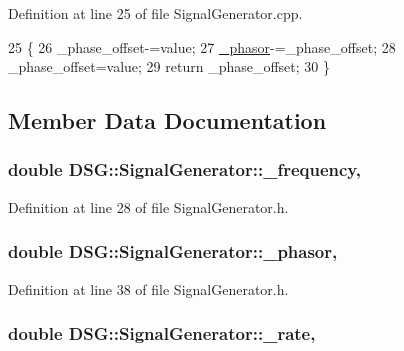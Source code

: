 Definition at line 25 of file Signal\+Generator.\+cpp.


\begin{DoxyCode}
25                                                                 \{
26     \_phase\_offset-=value;
27     \hyperlink{classDSG_1_1SignalGenerator_ac2271b582bf699275f077ecb642a8cd9}{\_phasor}-=\_phase\_offset;
28     \_phase\_offset=value;
29     \textcolor{keywordflow}{return} \_phase\_offset;
30 \}\end{DoxyCode}


\subsection{Member Data Documentation}
\hypertarget{classDSG_1_1SignalGenerator_a67e296e3506dcdf09402c667cddff9ac}{
\subsubsection[{\+\_\+frequency}]{\setlength{\rightskip}{0pt plus 5cm}double D\+S\+G\+::\+Signal\+Generator\+::\+\_\+frequency\hspace{0.3cm}{\ttfamily [protected]}, {\ttfamily [inherited]}}}\label{classDSG_1_1SignalGenerator_a67e296e3506dcdf09402c667cddff9ac}


Definition at line 28 of file Signal\+Generator.\+h.

\hypertarget{classDSG_1_1SignalGenerator_ac2271b582bf699275f077ecb642a8cd9}{
\subsubsection[{\+\_\+phasor}]{\setlength{\rightskip}{0pt plus 5cm}double D\+S\+G\+::\+Signal\+Generator\+::\+\_\+phasor\hspace{0.3cm}{\ttfamily [protected]}, {\ttfamily [inherited]}}}\label{classDSG_1_1SignalGenerator_ac2271b582bf699275f077ecb642a8cd9}


Definition at line 38 of file Signal\+Generator.\+h.

\hypertarget{classDSG_1_1SignalGenerator_aa10f6c85d9adee901139ea7fb346f39d}{
\subsubsection[{\+\_\+rate}]{\setlength{\rightskip}{0pt plus 5cm}double D\+S\+G\+::\+Signal\+Generator\+::\+\_\+rate\hspace{0.3cm}{\ttfamily [protected]}, {\ttfamily [inherited]}}}\label{classDSG_1_1SignalGenerator_aa10f6c85d9adee901139ea7fb346f39d}


